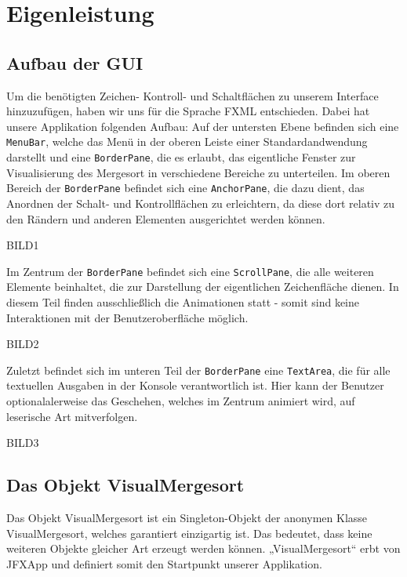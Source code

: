 
\chapter{Eigenleistung}\label{chap:eigenleistung}

\section{Aufbau der GUI}
Um die benötigten Zeichen- Kontroll- und Schaltflächen zu unserem Interface hinzuzufügen, haben wir uns für die Sprache
FXML entschieden. Dabei hat unsere Applikation folgenden Aufbau:
Auf der untersten Ebene befinden sich eine \texttt{MenuBar}, welche das Menü in der oberen Leiste
einer Standardandwendung darstellt und eine \texttt{BorderPane}, die es erlaubt, das eigentliche
Fenster zur Visualisierung des Mergesort in verschiedene Bereiche zu unterteilen. Im oberen Bereich der \texttt{BorderPane}
befindet sich eine \texttt{AnchorPane}, die dazu dient, das Anordnen der Schalt- und Kontrollflächen zu erleichtern, da diese dort
relativ zu den Rändern und anderen Elementen ausgerichtet werden können.

BILD1

Im Zentrum der \texttt{BorderPane} befindet sich eine \texttt{ScrollPane}, die alle weiteren Elemente beinhaltet,
die zur Darstellung der eigentlichen Zeichenfläche dienen. In diesem Teil finden ausschließlich die Animationen statt - somit sind keine Interaktionen mit der
Benutzeroberfläche möglich.

BILD2

Zuletzt befindet sich im unteren Teil der \texttt{BorderPane} eine \texttt{TextArea}, die für alle textuellen Ausgaben in der Konsole
verantwortlich ist. Hier kann der Benutzer optionalalerweise das Geschehen, welches im Zentrum animiert wird,
auf leserische Art mitverfolgen.

BILD3
\section{Das Objekt VisualMergesort}
Das Objekt VisualMergesort ist ein Singleton-Objekt der anonymen Klasse VisualMergesort, welches garantiert einzigartig ist. Das bedeutet, dass keine weiteren Objekte gleicher Art erzeugt werden können. „VisualMergesort“ erbt von JFXApp und definiert somit den Startpunkt unserer Applikation.

